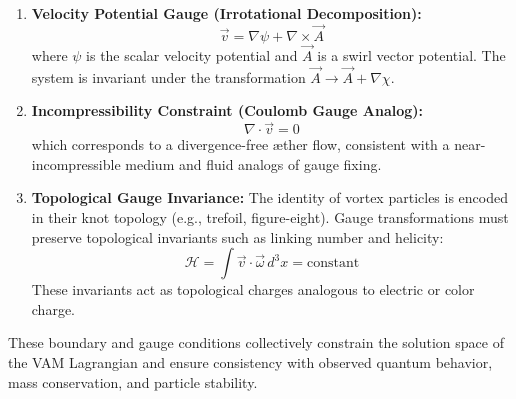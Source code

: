 \begin{enumerate}
    \item \textbf{Velocity Potential Gauge (Irrotational Decomposition):}
    \[
        \vec{v} = \nabla \psi + \nabla \times \vec{A}
    \]
    where $\psi$ is the scalar velocity potential and $\vec{A}$ is a swirl vector potential. The system is invariant under the transformation $\vec{A} \to \vec{A} + \nabla \chi$.

    \item \textbf{Incompressibility Constraint (Coulomb Gauge Analog):}
    \[
        \nabla \cdot \vec{v} = 0
    \]
    which corresponds to a divergence-free æther flow, consistent with a near-incompressible medium and fluid analogs of gauge fixing.

    \item \textbf{Topological Gauge Invariance:}
    The identity of vortex particles is encoded in their knot topology (e.g., trefoil, figure-eight). Gauge transformations must preserve topological invariants such as linking number and helicity:
    \[
        \mathcal{H} = \int \vec{v} \cdot \vec{\omega} \, d^3x = \text{constant}
    \]
    These invariants act as topological charges analogous to electric or color charge.
\end{enumerate}

These boundary and gauge conditions collectively constrain the solution space of the VAM Lagrangian and ensure consistency with observed quantum behavior, mass conservation, and particle stability.
